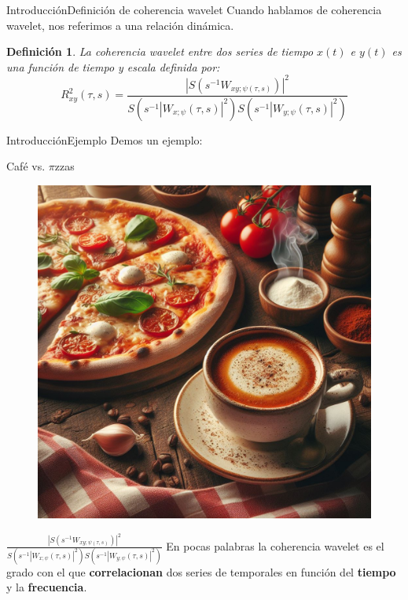 \documentclass[11pt]{beamer}
\newtheorem{definicion}{Definición}[section]
\begin{document}
    \begin{frame}{Introducción}{Definición de coherencia wavelet}
	Cuando hablamos de coherencia wavelet, nos referimos a una relación dinámica.

	\begin{definicion}
	    La coherencia wavelet entre dos series de tiempo $x(t)$ e $y(t)$ es una función de tiempo y escala definida por:
	    \begin{equation}
		R^{2}_{xy}(\tau,s)=\frac{\left|S\left(s^{-1}W_{xy;\psi(\tau,s)}\right)\right|^2}{S\left(s^{-1}\left|W_{x;\psi}(\tau,s)\right|^2\right)S\left(s^{-1}\left|W_{y;\psi}(\tau,s)\right|^2\right)}
	    \end{equation}
	\end{definicion}

    \end{frame}

    \begin{frame}{Introducción}{Ejemplo}
	Demos un ejemplo:

	\begin{center}
	    Café vs. $\pi$zzas
	\end{center}
	\begin{multicols}{2}
	     \begin{figure}
		 \includegraphics[scale=0.12]{cafePizza.jpeg}
	     \end{figure}
	     $\frac{\left|S\left(s^{-1}W_{xy;\psi(\tau,s)}\right)\right|^2}{S\left(s^{-1}\left|W_{x;\psi}(\tau,s)\right|^2\right)S\left(s^{-1}\left|W_{y;\psi}(\tau,s)\right|^2\right)}$
	     \vspace{5mm}
	    En pocas palabras la coherencia wavelet es el grado con el que \textbf{correlacionan} dos series de temporales en función del \textbf{tiempo} y la \textbf{frecuencia}.
	\end{multicols}

    \end{frame}
\end{document}
